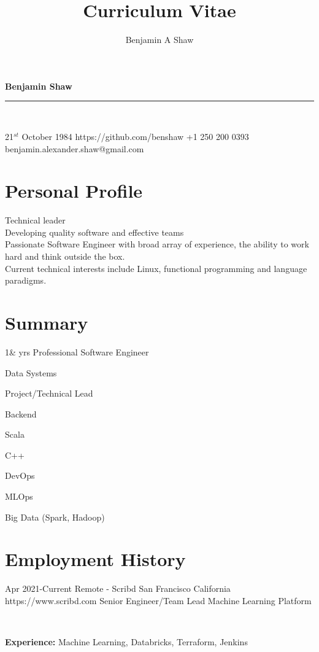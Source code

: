 \documentclass{article}
\title{Curriculum Vitae}
\author{Benjamin A Shaw}
\begin{document}
{\huge{\color{slateblue}\textbf{Benjamin Shaw}}}\\
\rule{\textwidth}{0.5mm}\\

\begin{personaldetails}
{21$^{st}$ October 1984}
{https://github.com/benshaw}
{+1 250 200 0393}
{benjamin.alexander.shaw@gmail.com}
\end{personaldetails}


\section*{Personal Profile}
\begin{profile}
Technical leader \\
Developing quality software and effective teams \\
Passionate Software Engineer with broad array of experience, the ability to work hard and think outside the box. \\
Current technical interests include Linux, functional programming and language paradigms.
\end{profile}

\section*{Summary}
\begin{itemize-spaced}
  \item 1& yrs Professional Software Engineer
  \item Data Systems  
  \item Project/Technical Lead
  \item Backend
  \item Scala 
  \item C++
  \item DevOps
  \item MLOps
  \item Big Data (Spark, Hadoop)
\end{itemize-spaced}

\section*{Employment History}

\begin{job}
{Apr 2021-}{Current}
{Remote - Scribd San Francisco California}
{https://www.scribd.com}
{Senior Engineer/Team Lead Machine Learning Platform}%
{   \\
\rule{0mm}{5mm}\textbf{Experience:} Machine Learning, Databricks, Terraform, Jenkins}
\end{job}
\end{document}

